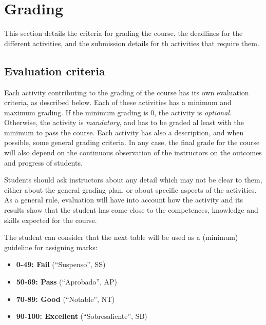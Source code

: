\documentclass[a4paper]{article}
\begin{document}


\section{Grading}

This section details the criteria for grading the course, the deadlines for the different activities, and the submission details for th activities that require them.

\subsection{Evaluation criteria}

Each activity contributing to the grading of the course has its own evaluation criteria, 
as described below. Each of these activities has a minimum and maximum grading. If the 
minimum grading is 0, the activity is \textit{optional}. Otherwise, the activity is \textit{mandatory}, and 
has to be graded al least with the minimum to pass the course. Each activity has also a 
description, and when possible, some general grading criteria. In any case, the final grade 
for the course will also depend on the continuous observation of the instructors on the 
outcomes and progress of students.

Students should ask instructors about any detail which may not be clear to them, 
either about the general grading plan, or about specific aspects of the activities. 
As a general rule, evaluation will have into account how the activity and its results 
show that the student has come close to the competences, knowledge and skills expected 
for the course.

The student can consider that the next table will be used as a (minimum) guideline for 
assigning marks:

\begin{itemize}
\item \textbf{0-49: Fail} (``Suspenso'', SS)
\item \textbf{50-69: Pass} (``Aprobado'', AP)
\item \textbf{70-89: Good} (``Notable'', NT)
\item \textbf{90-100: Excellent} (``Sobresaliente'', SB)

\end{itemize}
\end{document}
